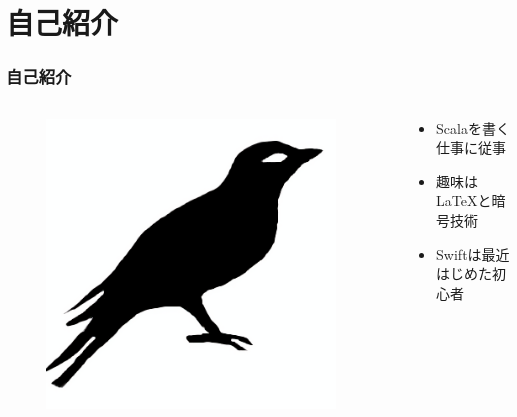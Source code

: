 




\newcommand\ballref[1]{%
\tikz \node[circle, shade,ball color=structure.fg,inner sep=0pt,%
  text width=8pt,font=\tiny,align=center] {\color{white}\ref{#1}};
}



\frame{\maketitle}

\section{自己紹介}
\begin{frame}
  \frametitle{自己紹介}
  
  \begin{columns}
    \begin{column}{0.35\textwidth}
      \centering
      \begin{figure}
        \includegraphics[width=0.95\textwidth]{img/bird2x.png}
      \end{figure}
    \end{column}
    \begin{column}{0.65\textwidth}
      \begin{itemize}
        \item<2-> Scalaを書く仕事に従事
        \item<3-> 趣味は\LaTeX と暗号技術
        \item<4-> Swiftは最近はじめた初心者 
      \end{itemize}
    \end{column}
  \end{columns}
\end{frame}

